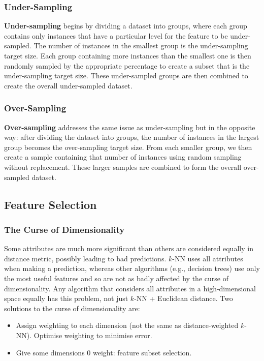 \documentclass[a4paper,11pt]{article}
\begin{document}
\subsubsection{Under-Sampling}
\textbf{Under-sampling} begins by dividing a dataset into groups, where each group contains only instances that have a particular level for the feature to be under-sampled.
The number of instances in the smallest group is the under-sampling target size.
Each group containing more instances than the smallest one is then randomly sampled by the appropriate percentage to create a subset that is the under-sampling target size.
These under-sampled groups are then combined to create the overall under-sampled dataset.

\subsubsection{Over-Sampling}
\textbf{Over-sampling} addresses the same issue as under-sampling but in the opposite way:
after dividing the dataset into groups, the number of instances in the largest group becomes the over-sampling target size.
From each smaller group, we then create a sample containing that number of instances using random sampling without replacement.
These larger samples are combined to form the overall over-sampled dataset.

\subsection{Feature Selection}
\subsubsection{The Curse of Dimensionality}
Some attributes are much more significant than others are considered equally in distance metric, possibly leading to bad predictions.
$k$-NN uses all attributes when making a prediction, whereas other algorithms (e.g., decision trees) use only the most useful features and so are not as badly affected by the curse of dimensionality.
Any algorithm that considers all attributes in a high-dimensional space equally has this problem, not just $k$-NN + Euclidean distance.
Two solutions to the curse of dimensionality are:
\begin{itemize}
    \item   Assign weighting to each dimension (not the same as distance-weighted $k$-NN).
            Optimise weighting to minimise error.
    \item   Give some dimensions 0 weight: feature subset selection.
\end{itemize}
\end{document}
